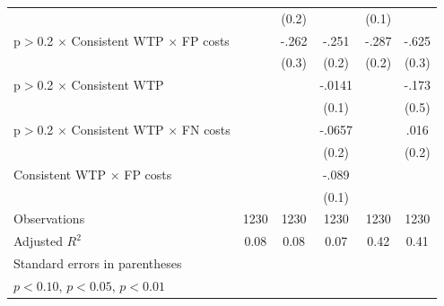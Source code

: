 \begin{table}[htbp]
\begin{tabular}{l*{5}{c}}
                &                  &    (0.2)         &                  &    (0.1)         &                  \\
p$>$0.2 $\times$ Consistent WTP $\times$ FP costs&                  &    -.262         &    -.251         &    -.287         &    -.625\sym{**} \\
                &                  &    (0.3)         &    (0.2)         &    (0.2)         &    (0.3)         \\
p$>$0.2 $\times$ Consistent WTP&                  &                  &   -.0141         &                  &    -.173         \\
                &                  &                  &    (0.1)         &                  &    (0.5)         \\
p$>$0.2 $\times$ Consistent WTP $\times$ FN costs&                  &                  &   -.0657         &                  &     .016         \\
                &                  &                  &    (0.2)         &                  &    (0.2)         \\
Consistent WTP $\times$ FP costs&                  &                  &    -.089         &                  &                  \\
                &                  &                  &    (0.1)         &                  &                  \\
\hline
Observations    &     1230         &     1230         &     1230         &     1230         &     1230         \\
Adjusted \(R^{2}\)&     0.08         &     0.08         &     0.07         &     0.42         &     0.41         \\
\hline\hline
\multicolumn{6}{l}{\footnotesize Standard errors in parentheses}\\
\multicolumn{6}{l}{\footnotesize \sym{*} \(p<0.10\), \sym{**} \(p<0.05\), \sym{***} \(p<0.01\)}\\
\end{tabular}
\end{table}
